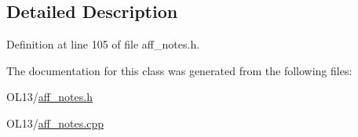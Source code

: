 \subsection{Detailed Description}


Definition at line 105 of file aff\+\_\+notes.\+h.



The documentation for this class was generated from the following files\+:\begin{DoxyCompactItemize}
\item 
O\+L13/\hyperlink{aff__notes_8h}{aff\+\_\+notes.\+h}\item 
O\+L13/\hyperlink{aff__notes_8cpp}{aff\+\_\+notes.\+cpp}\end{DoxyCompactItemize}
